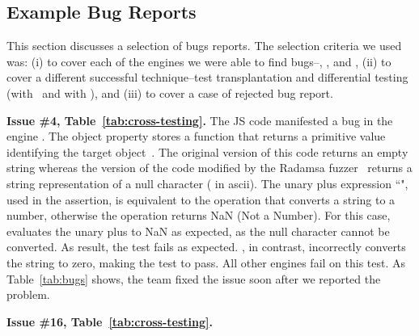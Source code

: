 \documentclass[10pt,conference,anonymous]{IEEEtran}
\begin{document}
\subsection{Example Bug Reports}

This section discusses a selection of bugs reports. The selection
criteria we used was: (i) to cover each of the engines we were able to
find bugs--\chakra, \jsc, and \veight, (ii) to cover a different
successful technique--test transplantation and differential testing
(with \radamsa\ and with \quickfuzz), and (iii) to cover a case of
rejected bug report.

\sloppy
\vspace{1ex}\noindent\textbf{Issue \#4, Table~\ref{tab:cross-testing}.} 
The JS code   manifested a bug in the \js{} engine \chakra{}.
The object property  stores a function that returns a
primitive value identifying the target object~\cite{valueof}. The
original version of this code returns an empty string whereas the
version of the code modified by the Radamsa fuzzer~\cite{radamsa}
returns a string representation of a null character ( in ascii). The unary plus expression ``",
used in the assertion, is equivalent to the operation
 that converts a string to a number,
otherwise the operation returns NaN (Not a
Number)\cite{unary-plus}. For this case, \chakra{} evaluates the unary
plus to NaN as expected, as the null character cannot be converted. As
result, the test fails as expected. \chakra{}, in contrast,
incorrectly converts the string to zero, making the test to pass. All
other engines fail on this test. As Table~\ref{tab:bugs} shows, the
\chakra{} team fixed the issue soon after we reported the problem.

\vspace{1ex}\noindent\textbf{Issue \#16, Table~\ref{tab:cross-testing}.}
\end{document}
